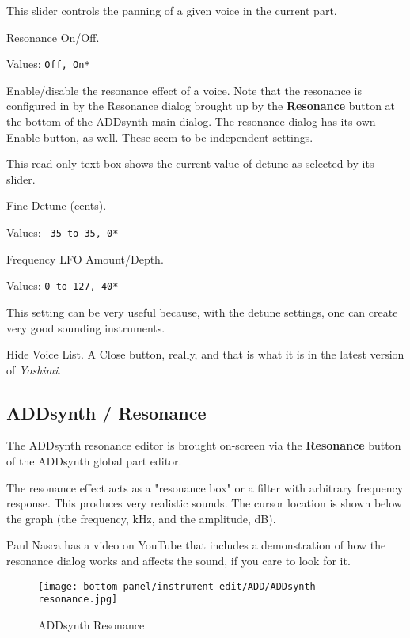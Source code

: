    This slider controls the panning of a given voice in the current part.

   Resonance On/Off.

   Values: \texttt{Off, On*}

   Enable/disable the resonance effect of a voice.
   Note that the resonance is configured in by the Resonance dialog brought
   up by the \textbf{Resonance} button at the bottom of the ADDsynth main
   dialog.  The resonance dialog has its own Enable button, as well.
   These seem to be independent settings.

   This read-only text-box shows the current value of detune as selected by
   its slider.

   Fine Detune (cents).

   Values: \texttt{-35 to 35, 0*}

   Frequency LFO Amount/Depth.

   Values: \texttt{0 to 127, 40*}

   This setting can be very useful because, with the detune settings, one can
   create very good sounding instruments. 

   Hide Voice List.  A Close button, really, and that is what it is in the
   latest version of \textsl{Yoshimi}.

\subsection{ADDsynth / Resonance}
\label{subsec:addsynth_resonance}

   The ADDsynth resonance editor is brought on-screen via the
   \textbf{Resonance} button of the ADDsynth global part editor.

   The resonance effect acts as a "resonance box" or a filter with arbitrary
   frequency response. This produces very realistic sounds. 
   The cursor location is shown below the graph (the frequency, kHz, and
   the amplitude, dB). 

   Paul Nasca has a video on YouTube that includes a demonstration of how
   the resonance dialog works and affects the sound, if you care to look for
   it.

\begin{figure}[H]
   \centering 
   \texttt{[image: bottom-panel/instrument-edit/ADD/ADDsynth-resonance.jpg]}
   \caption{ADDsynth Resonance}
   \label{fig:addsynth_resonance}
\end{figure}

